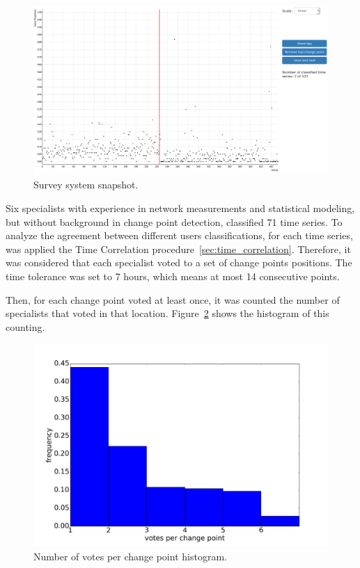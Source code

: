 \begin{figure}[H]
    \centering
    \includegraphics[width=0.9\linewidth]{./figures/methodology/supervised_learning_try/survey_system.png}
    \caption{Survey system snapshot.}
\label{fig:survey_system}
\end{figure}%

Six specialists with experience in network measurements and statistical
modeling, but without background in change point detection, classified 71 time
series.
To analyze the agreement between different users classifications,
for each time series, was applied the Time Correlation
procedure~\ref{sec:time_correlation}. Therefore, it was
considered that each specialist voted to a set of change points positions.
The time tolerance was set to 7 hours, which means at most 14 consecutive
points.

Then, for each change point voted at least once, it was counted the number of
specialists that voted in that location.
Figure~\ref{fig:classifications_per_vote} shows the histogram of this counting.

\begin{figure}[H]
    \centering
    \includegraphics[width=0.7\linewidth]{./figures/methodology/supervised_learning_try/cnt_classifications_per_vote.png}
    \caption{Number of votes per change point histogram.}
\label{fig:classifications_per_vote}
\end{figure}%

